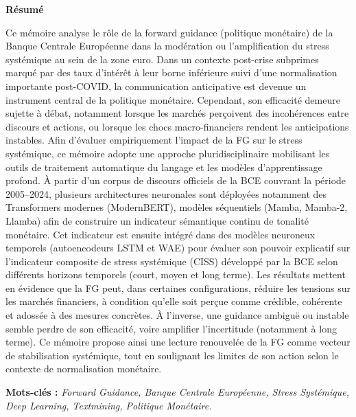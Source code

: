 {}

\begin{center}
  {\Huge\bfseries Résumé}
\end{center}

\vspace{1.5em}

\begin{adjustwidth}{2em}{2em}
\begin{sloppypar}
Ce mémoire analyse le rôle de la forward guidance (politique monétaire) de la Banque Centrale Européenne dans la modération ou l’amplification du stress systémique au sein de la zone euro. Dans un contexte post-crise subprimes marqué par des taux d’intérêt à leur borne inférieure suivi d'une normalisation importante post-COVID, la communication anticipative est devenue un instrument central de la politique monétaire. Cependant, son efficacité demeure sujette à débat, notamment lorsque les marchés perçoivent des incohérences entre discours et actions, ou lorsque les chocs macro-financiers rendent les anticipations instables. Afin d’évaluer empiriquement l’impact de la FG sur le stress systémique, ce mémoire adopte une approche pluridisciplinaire mobilisant les outils de traitement automatique du langage et les modèles d’apprentissage profond. À partir d’un corpus de discours officiels de la BCE couvrant la période 2005–2024, plusieurs architectures neuronales sont déployées notamment des Transformers modernes (ModernBERT), modèles séquentiels (Mamba, Mamba-2, Llamba) afin de construire un indicateur sémantique continu de tonalité monétaire. Cet indicateur est ensuite intégré dans des modèles neuroneux temporels (autoencodeurs LSTM et WAE) pour évaluer son pouvoir explicatif sur l’indicateur composite de stress systémique (CISS) développé par la BCE selon différents horizons temporels (court, moyen et long terme). Les résultats mettent en évidence que la FG peut, dans certaines configurations, réduire les tensions sur les marchés financiers, à condition qu’elle soit perçue comme crédible, cohérente et adossée à des mesures concrètes. À l’inverse, une guidance ambiguë ou instable semble perdre de son efficacité, voire amplifier l’incertitude (notamment à long terme). Ce mémoire propose ainsi une lecture renouvelée de la FG comme vecteur de stabilisation systémique, tout en soulignant les limites de son action selon le contexte de normalisation monétaire.
\end{sloppypar}
\end{adjustwidth}

\vspace{2em}

\noindent\textbf{Mots-clés :} \textit{Forward Guidance, Banque Centrale Européenne, Stress Systémique, Deep Learning, Textmining, Politique Monétaire.}

